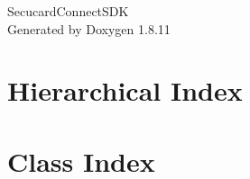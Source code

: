 \documentclass[twoside]{book}
\newcommand{\+}{\discretionary{\mbox{\scriptsize$\hookleftarrow$}}{}{}}
\newcommand{\clearemptydoublepage}{%
  \newpage{\pagestyle{empty}\cleardoublepage}%
}
\begin{document}
\hypersetup{pageanchor=false,
             bookmarksnumbered=true,
             pdfencoding=unicode
            }
\begin{titlepage}
\vspace*{7cm}
\begin{center}%
{\Large Secucard\+Connect\+S\+DK }\\
\vspace*{1cm}
{\large Generated by Doxygen 1.8.11}\\
\end{center}
\end{titlepage}
\clearemptydoublepage
\tableofcontents
\clearemptydoublepage
{}
\hypersetup{pageanchor=true}

\chapter{Hierarchical Index}

\chapter{Class Index}

\end{document}
